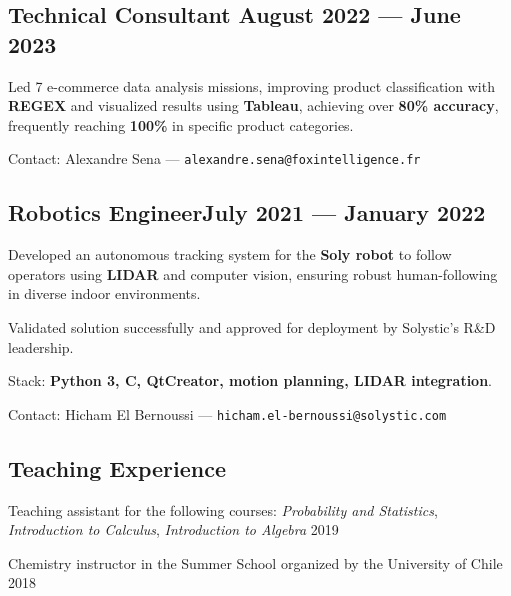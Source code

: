 \subsection{{Technical Consultant \hfill August 2022 --- June 2023}}
\begin{zitemize}
\item Led 7 e-commerce data analysis missions, improving product classification with \textbf{REGEX} and visualized results using \textbf{Tableau}, achieving over \textbf{80\% accuracy}, frequently reaching \textbf{100\%} in specific product categories.
\item Contact: Alexandre Sena --- \texttt{alexandre.sena@foxintelligence.fr}
\end{zitemize}

\subsection{{Robotics Engineer\hfill July 2021 --- January 2022}}
\begin{zitemize}
\item Developed an autonomous tracking system for the \textbf{Soly robot} to follow operators using \textbf{LIDAR} and computer vision, ensuring robust human-following in diverse indoor environments.
\item Validated solution successfully and approved for deployment by Solystic's R\&D leadership.
\item Stack: \textbf{Python 3, C, QtCreator, motion planning, LIDAR integration}.
\item Contact: Hicham El Bernoussi --- \texttt{hicham.el-bernoussi@solystic.com}
\end{zitemize}

\subsection{Teaching Experience}
\begin{zitemize}
\item Teaching assistant for the following courses: \textit{Probability and Statistics}, \textit{Introduction to Calculus}, \textit{Introduction to Algebra} \hfill 2019
\item Chemistry instructor in the Summer School organized by the University of Chile \hfill 2018
\end{zitemize}

